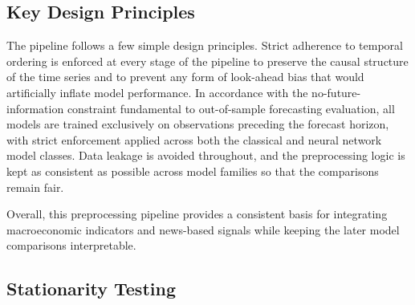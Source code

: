 \documentclass[pdflatex,sn-mathphys-num]{sn-jnl}%
\theoremstyle{thmstyleone}%
\theoremstyle{thmstyletwo}%
\theoremstyle{thmstylethree}%
\begin{document}
\subsection{Key Design Principles}\label{subsec:keydesign}

The pipeline follows a few simple design principles. Strict adherence to temporal ordering is enforced at every stage of the pipeline to preserve the causal structure of the time series and to prevent any form of look-ahead bias that would artificially inflate model performance. In accordance with the no-future-information constraint fundamental to out-of-sample forecasting evaluation, all models are trained exclusively on observations preceding the forecast horizon, with strict enforcement applied across both the classical and neural network model classes. Data leakage is avoided throughout, and the preprocessing logic is kept as consistent as possible across model families so that the comparisons remain fair.

Overall, this preprocessing pipeline provides a consistent basis for integrating macroeconomic indicators and news-based signals while keeping the later model comparisons interpretable.

\subsection{Stationarity Testing}\label{subsec:stationarity}
\end{document}
